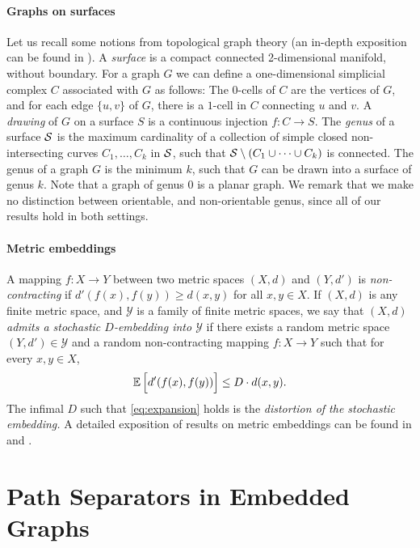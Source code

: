 \documentclass[envcountsect]{llncs}
\begin{document}
\paragraph{Graphs on surfaces}
Let us recall some notions from topological graph theory (an in-depth
exposition can be found in \cite{MoharT-book}).  A \emph{surface} is a
compact connected 2-dimensional manifold, without boundary.
For a graph $G$ we can
define a one-dimensional simplicial complex $C$ associated with $G$ as
follows: The $0$-cells of $C$ are the vertices of $G$, and for each
edge $\{u,v\}$ of $G$, there is a $1$-cell in $C$ connecting $u$ and
$v$.  A \emph{drawing} of $G$ on a surface $S$ is a continuous injection
$f:C\rightarrow S$.
The \emph{genus} of a surface ${\cal S}$ is the maximum cardinality of a collection
of simple closed non-intersecting curves $C_1,\dots,C_k$ in $\cal S$, such that ${\cal S} \setminus (C_1 \cup \dots \cup C_k)$ is connected.
The genus of a graph $G$ is the minimum $k$, such that $G$ can be drawn into a surface of genus $k$.
Note that a graph of genus $0$ is a planar graph.
We remark that we make no distinction between orientable, and non-orientable genus, since all of our results hold in both settings.

\paragraph{Metric embeddings}
A mapping $f : X \to Y$ between two metric spaces $(X,d)$ and $(Y,d')$
is {\em non-contracting} if $d'(f(x),f(y)) \geq d(x,y)$ for all $x,y \in X$.
If $(X,d)$ is any finite metric space, and $\mathcal Y$
is a family of finite metric spaces, we say that {\em $(X,d)$ admits a stochastic $D$-embedding into $\mathcal Y$} if there exists a random metric space $(Y,d') \in \mathcal Y$ and a random
non-contracting mapping $f : X \to Y$ such that for every $x,y \in X$,
\begin{equation}
\label{eq:expansion}
\mathbb E\left[\vphantom{\bigoplus} d'(f(x),f(y))\right] \leq D \cdot d(x,y).
\end{equation}
The infimal $D$ such that \eqref{eq:expansion} holds is the {\em distortion of
the stochastic embedding.}
A detailed exposition of  results on metric embeddings can be found in \cite{I-survey} and \cite{Matousek-book}.




\section{Path Separators in Embedded Graphs}
\end{document}
